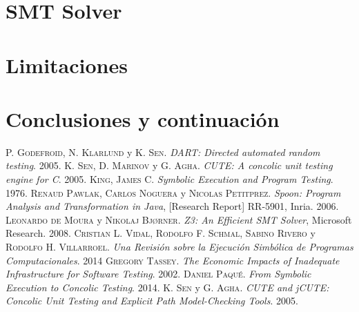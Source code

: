 \documentclass{llncs}
\begin{document}
\section{SMT Solver}


\section{Limitaciones}


\section{Conclusiones y continuación}



\begin{thebibliography}{X}
 \textsc{P. Godefroid}, \textsc{N. Klarlund} y \textsc{K. Sen}. \textit{DART: Directed automated random testing}. 2005.
 \textsc{K. Sen}, \textsc{D. Marinov} y \textsc{G. Agha}. \textit{CUTE: A concolic unit testing engine for C}. 2005.
 \textsc{King, James C}. \textit{Symbolic Execution and Program Testing}. 1976.
 \textsc{Renaud Pawlak}, \textsc{Carlos Noguera} y \textsc{Nicolas Petitprez}. \textit{Spoon: Program Analysis and Transformation in Java}, [Research Report] RR-5901, Inria. 2006.
 \textsc{Leonardo de Moura} y \textsc{Nikolaj Bjørner}. \textit{Z3: An Efficient SMT Solver}, Microsoft Research. 2008.
 \textsc{Cristian L. Vidal}, \textsc{Rodolfo F. Schmal}, \textsc{Sabino Rivero} y \textsc{Rodolfo H. Villarroel}. \textit{Una Revisión sobre la Ejecución Simbólica de Programas Computacionales}. 2014
 \textsc{Gregory Tassey}. \textit{The Economic Impacts of Inadequate Infrastructure for Software Testing}. 2002.
 \textsc{Daniel Paqué}. \textit{From Symbolic Execution to  Concolic Testing}. 2014.
 \textsc{K. Sen} y \textsc{G. Agha}. \textit{CUTE and jCUTE: Concolic Unit Testing and Explicit Path Model-Checking Tools}. 2005.
\end{thebibliography}
\end{document}
